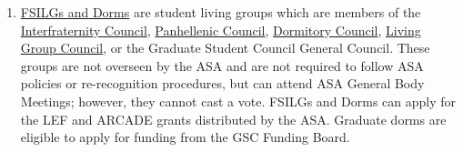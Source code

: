 \documentclass[12pt]{constitution}
\def\ul{\underline}
\begin{document}
\begin{enumerate}
    \item \ul{FSILGs and Dorms} are student living groups which are members of the
        \href{http://www.mitifc.com/}{Interfraternity Council}, \href{https://www.mitpanhel.com/home}{Panhellenic Council},
        \href{https://dormcon.mit.edu/}{Dormitory Council}, \href{https://lgc.mit.edu/}{Living Group Council}, or the
        Graduate Student Council General Council.
    These groups are not overseen by the ASA and are not required to follow ASA policies or re-recognition procedures,
        but can attend ASA General Body Meetings; however, they cannot cast a vote.
    FSILGs and Dorms can apply for the LEF and ARCADE grants distributed by the ASA.
    Graduate dorms are eligible to apply for funding from the GSC Funding Board.
\end{enumerate}
\end{document}
